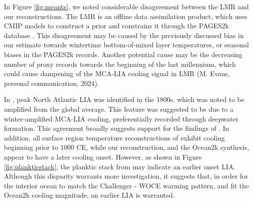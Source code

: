 \documentclass[draft]{agujournal2019}
\begin{document}
In Figure \ref{fig:meants}, we noted considerable disagreement between the LMR and our reconstructions. The LMR is an offline data assimilation product, which uses CMIP models to construct a prior and constrains it through the PAGES2k database \cite[]{Hakim-Emile-Geay-2016:last}. This disagreement may be caused by the previously discussed bias in our estimate towards wintertime bottom-of-mixed layer temperatures, or seasonal biases in the PAGES2k records. Another potential cause may be the decreasing number of proxy records towards the beginning of the last millennium, which could cause dampening of the MCA-LIA cooling signal in LMR (M. Evans, personal communication, 2024). 

In , peak North Atlantic LIA was identified in the 1800s, which was noted to be amplified from the global average. This feature was suggested to be due to a winter-amplified MCA-LIA cooling, preferentially recorded through deepwater formation.
This agreement broadly suggests support for the findings of . In addition, all surface region temperature reconstructions of  exhibit cooling beginning prior to 1000 CE, while our reconstruction, and the Ocean2k synthesis, appear to have a later cooling onset. However, as shown in Figure \ref{fig:plankticstack}, the planktic stack from  may indicate an earlier onset LIA. Although this disparity warrants more investigation, it suggests that, in order for the interior ocean to match the Challenger - WOCE warming pattern, and fit the Ocean2k cooling magnitude, an earlier LIA is warranted. 
\end{document}
